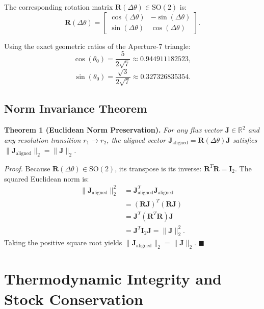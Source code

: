 \documentclass[10pt,journal,compsoc]{IEEEtran}
\begin{document}
The corresponding rotation matrix $\mathbf{R}(\Delta \theta) \in \mathrm{SO}(2)$ is:
\begin{equation}
\mathbf{R}(\Delta \theta) = \begin{bmatrix}
\cos(\Delta \theta) & -\sin(\Delta \theta) \\
\sin(\Delta \theta) & \cos(\Delta \theta)
\end{bmatrix}.
\end{equation}

Using the exact geometric ratios of the Aperture-7 triangle:
\begin{equation}
\cos(\theta_0) = \frac{5}{2\sqrt{7}} \approx 0.944911182523,
\end{equation}
\begin{equation}
\sin(\theta_0) = \frac{\sqrt{3}}{2\sqrt{7}} \approx 0.327326835354.
\end{equation}

\subsection{Norm Invariance Theorem}
\textbf{Theorem 1 (Euclidean Norm Preservation).} \textit{For any flux vector $\mathbf{J} \in \mathbb{R}^2$ and any resolution transition $r_1 \to r_2$, the aligned vector $\mathbf{J}_{\text{aligned}} = \mathbf{R}(\Delta \theta)\mathbf{J}$ satisfies $\|\mathbf{J}_{\text{aligned}}\|_2 = \|\mathbf{J}\|_2$.}

\textit{Proof.} Because $\mathbf{R}(\Delta \theta) \in \mathrm{SO}(2)$, its transpose is its inverse: $\mathbf{R}^T \mathbf{R} = \mathbf{I}_2$. The squared Euclidean norm is:
\begin{align}
\|\mathbf{J}_{\text{aligned}}\|_2^2 &= \mathbf{J}_{\text{aligned}}^T \mathbf{J}_{\text{aligned}} \nonumber \\
&= (\mathbf{R}\mathbf{J})^T (\mathbf{R}\mathbf{J}) \nonumber \\
&= \mathbf{J}^T (\mathbf{R}^T \mathbf{R}) \mathbf{J} \nonumber \\
&= \mathbf{J}^T \mathbf{I}_2 \mathbf{J} = \|\mathbf{J}\|_2^2.
\end{align}
Taking the positive square root yields $\|\mathbf{J}_{\text{aligned}}\|_2 = \|\mathbf{J}\|_2$. \hfill $\blacksquare$

\section{Thermodynamic Integrity and Stock Conservation}
\end{document}
